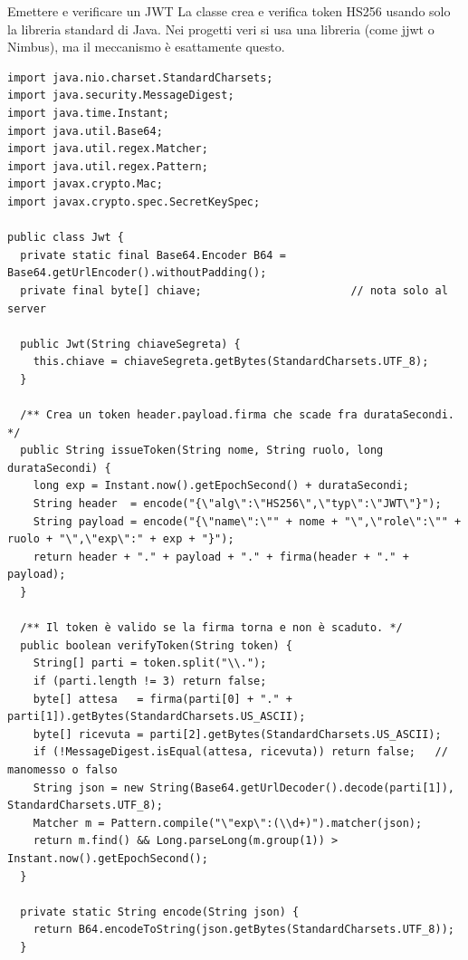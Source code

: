\begin{esempio}{Emettere e verificare un JWT}
La classe crea e verifica token HS256 usando solo la libreria standard di Java. Nei progetti veri si usa una libreria
(come jjwt o Nimbus), ma il meccanismo è esattamente questo.
\begin{lstlisting}[style=java, name=Jwt.java]
import java.nio.charset.StandardCharsets;
import java.security.MessageDigest;
import java.time.Instant;
import java.util.Base64;
import java.util.regex.Matcher;
import java.util.regex.Pattern;
import javax.crypto.Mac;
import javax.crypto.spec.SecretKeySpec;

public class Jwt {
  private static final Base64.Encoder B64 = Base64.getUrlEncoder().withoutPadding();
  private final byte[] chiave;                       // nota solo al server

  public Jwt(String chiaveSegreta) {
    this.chiave = chiaveSegreta.getBytes(StandardCharsets.UTF_8);
  }

  /** Crea un token header.payload.firma che scade fra durataSecondi. */
  public String issueToken(String nome, String ruolo, long durataSecondi) {
    long exp = Instant.now().getEpochSecond() + durataSecondi;
    String header  = encode("{\"alg\":\"HS256\",\"typ\":\"JWT\"}");
    String payload = encode("{\"name\":\"" + nome + "\",\"role\":\"" + ruolo + "\",\"exp\":" + exp + "}");
    return header + "." + payload + "." + firma(header + "." + payload);
  }

  /** Il token è valido se la firma torna e non è scaduto. */
  public boolean verifyToken(String token) {
    String[] parti = token.split("\\.");
    if (parti.length != 3) return false;
    byte[] attesa   = firma(parti[0] + "." + parti[1]).getBytes(StandardCharsets.US_ASCII);
    byte[] ricevuta = parti[2].getBytes(StandardCharsets.US_ASCII);
    if (!MessageDigest.isEqual(attesa, ricevuta)) return false;   // manomesso o falso
    String json = new String(Base64.getUrlDecoder().decode(parti[1]), StandardCharsets.UTF_8);
    Matcher m = Pattern.compile("\"exp\":(\\d+)").matcher(json);
    return m.find() && Long.parseLong(m.group(1)) > Instant.now().getEpochSecond();
  }

  private static String encode(String json) {
    return B64.encodeToString(json.getBytes(StandardCharsets.UTF_8));
  }


\end{lstlisting}
\end{esempio}
